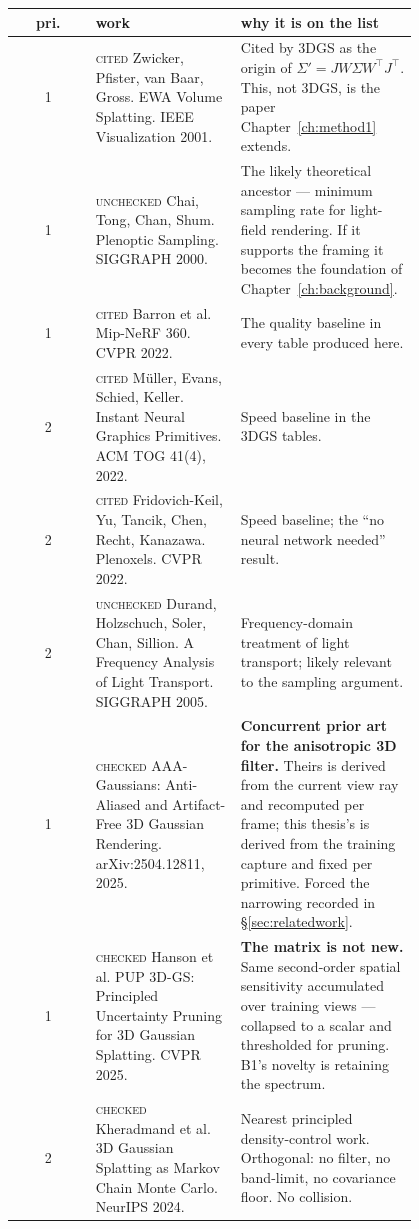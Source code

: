 \begin{table}[htbp]
  \centering
  \small
  \begin{tabular}{cp{0.36\linewidth}p{0.44\linewidth}}
    \toprule
    pri. & work & why it is on the list \\
    \midrule
    1 & \textsc{cited} Zwicker, Pfister, van Baar, Gross. EWA Volume Splatting. IEEE Visualization 2001. & Cited by 3DGS as the origin of $\Sigma' = JW\Sigma W^{\!\top}J^{\!\top}$. This, not 3DGS, is the paper Chapter~\ref{ch:method1} extends. \\
    1 & \textsc{unchecked} Chai, Tong, Chan, Shum. Plenoptic Sampling. SIGGRAPH 2000. & The likely theoretical ancestor --- minimum sampling rate for light-field rendering. If it supports the framing it becomes the foundation of Chapter~\ref{ch:background}. \\
    1 & \textsc{cited} Barron et al. Mip-NeRF 360. CVPR 2022. & The quality baseline in every table produced here. \\
    2 & \textsc{cited} M\"uller, Evans, Schied, Keller. Instant Neural Graphics Primitives. ACM TOG 41(4), 2022. & Speed baseline in the 3DGS tables. \\
    2 & \textsc{cited} Fridovich-Keil, Yu, Tancik, Chen, Recht, Kanazawa. Plenoxels. CVPR 2022. & Speed baseline; the ``no neural network needed'' result. \\
    2 & \textsc{unchecked} Durand, Holzschuch, Soler, Chan, Sillion. A Frequency Analysis of Light Transport. SIGGRAPH 2005. & Frequency-domain treatment of light transport; likely relevant to the sampling argument. \\
    1 & \textsc{checked} AAA-Gaussians: Anti-Aliased and Artifact-Free 3D Gaussian Rendering. arXiv:2504.12811, 2025. & \textbf{Concurrent prior art for the anisotropic 3D filter.} Theirs is derived from the current view ray and recomputed per frame; this thesis's is derived from the training capture and fixed per primitive. Forced the narrowing recorded in \S\ref{sec:relatedwork}. \\
    1 & \textsc{checked} Hanson et al. PUP 3D-GS: Principled Uncertainty Pruning for 3D Gaussian Splatting. CVPR 2025. & \textbf{The matrix is not new.} Same second-order spatial sensitivity accumulated over training views --- collapsed to a scalar and thresholded for pruning. B1's novelty is retaining the spectrum. \\
    2 & \textsc{checked} Kheradmand et al. 3D Gaussian Splatting as Markov Chain Monte Carlo. NeurIPS 2024. & Nearest principled density-control work. Orthogonal: no filter, no band-limit, no covariance floor. No collision. \\

\end{tabular}
\end{table}
